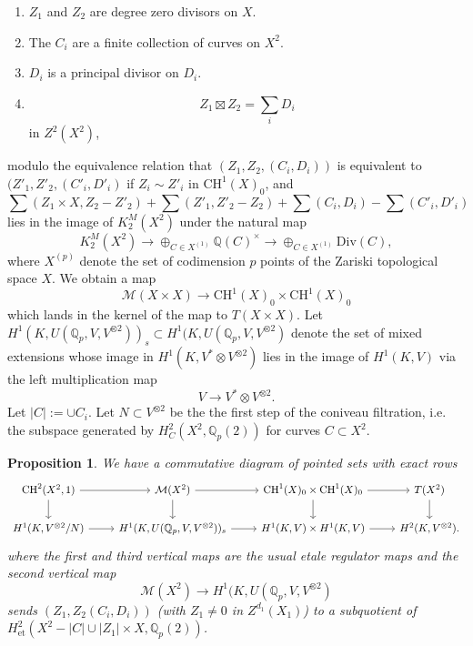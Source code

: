 \documentclass[11pt]{amsart}
\def\Q{\mathbb Q}
\newcommand{\Div}{\mathrm{Div}}
\theoremstyle{plain}
\newtheorem{proposition}{Proposition}
\theoremstyle{definition}
\DeclareMathOperator{\Gal}{Gal}
\newcommand{\CH}{\mathrm{CH}}
\newcommand{\et}{\mathrm{et}}
\begin{document}
\begin{enumerate}
\item $Z_1 $ and $Z_2 $ are degree zero divisors on $X$.
\item The $C_i $ are a finite collection of curves on $X^2 $.
\item $D_i$ is a principal divisor on $D_i $.
\item 
\[
Z_1 \boxtimes Z_2 =\sum _i D_i
\]
in $Z^2 (X^2 )$,
\end{enumerate}
modulo the equivalence relation that $(Z_1 ,Z_2 ,(C_i ,D_i ))$ is equivalent to $(Z' _1 ,Z'_2 ,(C' _i ,D' _i )$ if $Z_i \sim Z' _i $ in $\CH ^1 (X)_0$, and 
\[
\sum (Z_1 \times X,Z_2 -Z'_2 )+\sum (Z'_1 ,Z'_2 -Z_2 )+\sum (C_i ,D_i )-\sum (C'_i ,D'_i )
\]
lies in the image of $K^M _2 (X^2 )$ under the natural map
\[
K^M _2 (X^2 )\to \oplus _{C\in X^{(1)}}\Q (C)^\times \to \oplus _{C\in X^{(1)}}\Div (C),
\]
where $X^{(p)}$ denote the set of codimension $p$ points of the Zariski topological space $X$. We obtain a map
\[
\mathcal{M}(X\times X)\to \CH^1 (X)_0 \times \CH^1 (X)_0
\]
which lands in the kernel of the map to $T(X\times X)$. Let $H^1 (K,U(\Q _p ,V,V^{\otimes 2}))_{s}\subset H^1 (K,U(\Q _p ,V,V^{\otimes 2})$ denote the set of mixed extensions whose image in $H^1 (K,V^* \otimes V^{\otimes 2})$ lies in the image of $H^1 (K,V)$ via the left multiplication map
\[
V\to V^* \otimes V^{\otimes 2}.
\]
Let $|C|:=\cup C_i $. Let $N\subset V^{\otimes 2}$ be the the first step of the coniveau filtration, i.e. the subspace generated by $H^2 _C (X^2 ,\Q _p (2))$ for curves $C \subset X^2 $.
\begin{proposition}\label{prop:bigdiagram}
We have a commutative diagram of pointed sets with exact rows
\[
\begin{tikzcd}
\CH ^2 (X^2 ,1) \arrow[d] \arrow[r] & \mathcal{M}(X^2 ) \arrow[d] \arrow[r] & {\CH ^1 (X)_0 \times \CH ^1 (X)_0} \arrow[d] \arrow[r] & T(X^2 ) \arrow[d] \\
H^1 (K,V^{\otimes 2}/N) \arrow[r]           & {H^1 (K,U(\Q _p ,V,V^{\otimes 2}))_{s}} \arrow[r]           & H^1 (K,V)\times H^1 (K,V) \arrow[r]           & H^2 (K,V^{\otimes 2}).
\end{tikzcd}
\]
where the first and third vertical maps are the usual etale regulator maps and the second vertical map
\[
\mathcal{M}(X^2 ) \to H^1 (K,U(\Q _p ,V,V^{\otimes 2})
\]
sends $(Z_1 ,Z_2 (C_i ,D_i ))$ (with $Z_1 \neq 0$ in $Z^{d_1 }(X_1 )$) to a subquotient of $H^2 _{\et }(X^2 - |C|\cup |Z_1 |\times X ,\Q _p (2))$.
\end{proposition}
\end{document}
